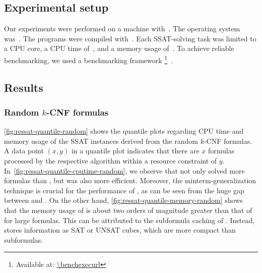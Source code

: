 \subsection{Experimental setup}
Our experiments were performed on a machine with~\machineSpec.
The operating system was~\osInfo.
The programs were compiled with~\compiler.
Each SSAT-solving task was limited to a CPU core,
a CPU time of~\timelimit,
and a memory usage of~\memlimit.
To achieve reliable benchmarking,
we used a benchmarking framework \benchexec\footnote{Available at: \url{\benchexecurl}}~\cite{Benchmarking-STTT}.

\subsection{Results}

\subsubsection{Random $k$-CNF formulas}

\cref{fig:ressat-quantile-random} shows the quantile plots regarding CPU time and memory usage
of the SSAT instances derived from the random $k$-CNF formulas.
A data point $(x,y)$ in a quantile plot indicates that
there are $x$ formulas processed by the respective algorithm within a resource constraint of $y$.
In~\cref{fig:ressat-quantile-cputime-random},
we observe that \ressat not only solved more formulas than \dcssat,
but was also more efficient.
Moreover, the minterm-generalization technique is crucial for the performance of \ressat,
as can be seen from the huge gap between \ressat and \ressatb.
On the other hand,
\cref{fig:ressat-quantile-memory-random} shows that the memory usage of \dcssat is about two orders of magnitude greater than that of \ressat for large formulas.
This can be attributed to the subformula caching of \dcssat.
Instead, \ressat stores information as SAT or UNSAT cubes,
which are more compact than subformulas.

